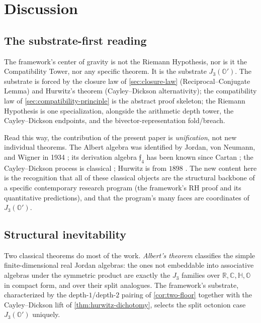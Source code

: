 \documentclass[11pt,a4paper]{article}
\theoremstyle{plain}
\theoremstyle{definition}
\theoremstyle{remark}
\numberwithin{equation}{section}
\providecommand{\R}{\mathbb{R}}
\providecommand{\C}{\mathbb{C}}
\providecommand{\HH}{\mathbb{H}}
\providecommand{\OO}{\mathbb{O}}
\providecommand{\Os}{\mathbb{O}'}
\providecommand{\fk}[1]{\mathfrak{#1}}
\begin{document}
\section{Discussion}
\label{sec:discussion}

\subsection{The substrate-first reading}

The framework's center of gravity is not the Riemann Hypothesis,
nor is it the Compatibility Tower, nor any specific theorem.  It
is the substrate $J_3(\Os)$.  The substrate is forced by the
closure law of \cref{sec:closure-law} (Reciprocal--Conjugate
Lemma) and Hurwitz's theorem (Cayley--Dickson alternativity); the
compatibility law of \cref{sec:compatibility-principle} is the
abstract proof skeleton; the Riemann Hypothesis is one
specialization, alongside the arithmetic depth tower, the
Cayley--Dickson endpoints, and the bivector-representation
fold/breach.

Read this way, the contribution of the present paper is
\emph{unification}, not new individual theorems.  The Albert
algebra was identified by Jordan, von Neumann, and Wigner in 1934
\cite{jordan-vonNeumann-wigner1934}; its derivation algebra
$\fk{f}_4$ has been known since Cartan \cite{cartan1894}; the
Cayley--Dickson process is classical
\cite{baez-octonions,schafer1966nonassoc}; Hurwitz is from $1898$
\cite{hurwitz1898}.  The new content here is the recognition that
all of these classical objects are the structural backbone of a
specific contemporary research program (the framework's RH proof
and its quantitative predictions), and that the program's many
faces are coordinates of $J_3(\Os)$.

\subsection{Structural inevitability}

Two classical theorems do most of the work.  \emph{Albert's
theorem} \cite{albert1934} classifies the simple finite-dimensional
real Jordan algebras: the ones not embeddable into associative
algebras under the symmetric product are exactly the $J_3$
families over $\R, \C, \HH, \OO$ in compact form, and over their
split analogues.  The framework's substrate, characterized by
the depth-$1$/depth-$2$ pairing of \cref{cor:two-floor} together
with the Cayley--Dickson lift of \cref{thm:hurwitz-dichotomy},
selects the split octonion case $J_3(\Os)$ uniquely.
\end{document}
